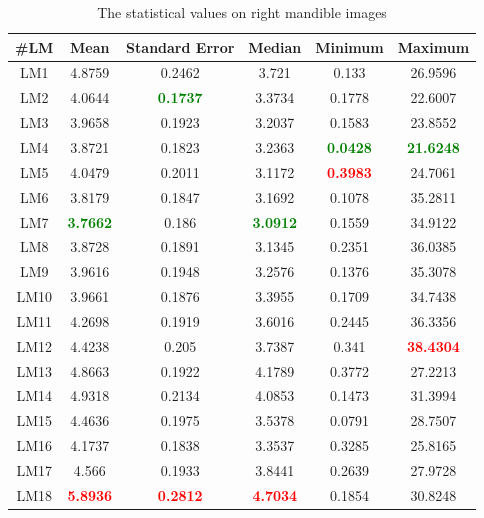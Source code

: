 \documentclass[review]{elsarticle}
\begin{document}
\begin{table}[htbp]
	\begin{tabular}{ | c | c | c | c | c | c | }
\hline
	 \textbf{\#LM} & \textbf{Mean} & \textbf{Standard Error} & \textbf{Median} & \textbf{Minimum} & \textbf{Maximum} \\ \hline
	LM1 & 4.8759 & 0.2462 & 3.721 & 0.133 & 26.9596 \\ \hline
	LM2 & 4.0644 & \textcolor{green}{\textbf{0.1737}} & 3.3734 & 0.1778 & 22.6007 \\ \hline
	LM3 & 3.9658 & 0.1923 & 3.2037 & 0.1583 & 23.8552 \\ \hline
	LM4 & 3.8721 & 0.1823 & 3.2363 & \textcolor{green}{\textbf{0.0428}} & \textcolor{green}{\textbf{21.6248}} \\ \hline
	LM5 & 4.0479 & 0.2011 & 3.1172 & \textcolor{red}{\textbf{0.3983}} & 24.7061 \\ \hline
	LM6 & 3.8179 & 0.1847 & 3.1692 & 0.1078 & 35.2811 \\ \hline
	LM7 & \textcolor{green}{\textbf{3.7662}} & 0.186 & \textcolor{green}{\textbf{3.0912}} & 0.1559 & 34.9122 \\ \hline
	LM8 & 3.8728 & 0.1891 & 3.1345 & 0.2351 & 36.0385 \\ \hline
	LM9 & 3.9616 & 0.1948 & 3.2576 & 0.1376 & 35.3078 \\ \hline
	LM10 & 3.9661 & 0.1876 & 3.3955 & 0.1709 & 34.7438 \\ \hline
	LM11 & 4.2698 & 0.1919 & 3.6016 & 0.2445 & 36.3356 \\ \hline
	LM12 & 4.4238 & 0.205 & 3.7387 & 0.341 & \textcolor{red}{\textbf{38.4304}} \\ \hline
	LM13 & 4.8663 & 0.1922 & 4.1789 & 0.3772 & 27.2213 \\ \hline
	LM14 & 4.9318 & 0.2134 & 4.0853 & 0.1473 & 31.3994 \\ \hline
	LM15 & 4.4636 & 0.1975 & 3.5378 & 0.0791 & 28.7507 \\ \hline
	LM16 & 4.1737 & 0.1838 & 3.3537 & 0.3285 & 25.8165 \\ \hline
	LM17 & 4.566 & 0.1933 & 3.8441 & 0.2639 & 27.9728 \\ \hline
	LM18 & \textcolor{red}{\textbf{5.8936}} & \textcolor{red}{\textbf{0.2812}} & \textcolor{red}{\textbf{4.7034}} & 0.1854 & 30.8248 \\ \hline
\end{tabular}
\caption{The statistical values on right mandible images}
\label{a5}
\end{table}
\pagebreak
\end{document}
